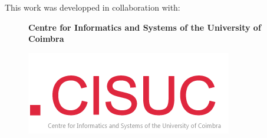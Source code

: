 
\thispagestyle{plain}

\centerline{This work was developped in collaboration with:}
\vspace{50pt}

\begin{figure}[H]
    \centering
    \textbf{Centre for Informatics and Systems of the University of Coimbra}\par\medskip
    \includegraphics[scale=1]{../images/entities/header_cisuc.png}
\end{figure}
